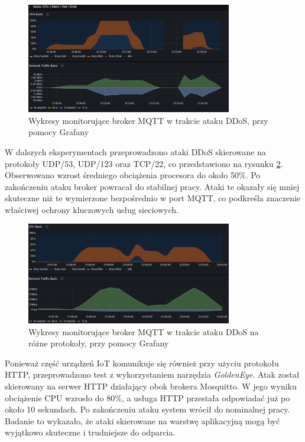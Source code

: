 \begin{figure}[h]
    \centering
    \includegraphics[width=0.8\textwidth]{pictures/hping-mqtt-z -i-bez.png}
    \caption{Wykresy monitorujące broker MQTT w trakcie ataku DDoS, przy pomocy Grafany}
    \label{fig:Wykresy moniturujące broker MQTT w trakcie ataku DDOS, przy pomocy Grafany1}
\end{figure}

W dalszych eksperymentach przeprowadzono ataki DDoS skierowane na protokoły UDP/53, UDP/123 oraz TCP/22, co przedstawiono na rysunku \ref{fig:Wykresy moniturujące broker MQTT w trakcie ataku DDOS na różne protokoły, przy pomocy Grafany2}. Obserwowano wzrost średniego obciążenia procesora do około 50\%. Po zakończeniu ataku broker powracał do stabilnej pracy. Ataki te okazały się mniej skuteczne niż te wymierzone bezpośrednio w port MQTT, co podkreśla znaczenie właściwej ochrony kluczowych usług sieciowych.

\begin{figure}[h]
    \centering
    \includegraphics[width=0.8\textwidth]{pictures/hping-protokoly.png}
    \caption{Wykresy monitorujące broker MQTT w trakcie ataku DDoS na różne protokoły, przy pomocy Grafany}
    \label{fig:Wykresy moniturujące broker MQTT w trakcie ataku DDOS na różne protokoły, przy pomocy Grafany2}
\end{figure}

Ponieważ część urządzeń IoT komunikuje się również przy użyciu protokołu HTTP, przeprowadzono test z wykorzystaniem narzędzia \textit{GoldenEye}. Atak został skierowany na serwer HTTP działający obok brokera Mosquitto. W jego wyniku obciążenie CPU wzrosło do 80\%, a usługa HTTP przestała odpowiadać już po około 10 sekundach. Po zakończeniu ataku system wrócił do nominalnej pracy. Badanie to wykazało, że ataki skierowane na warstwę aplikacyjną mogą być wyjątkowo skuteczne i trudniejsze do odparcia.

